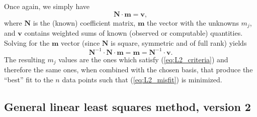 Once again, we simply have
\begin{equation}
\mathbf{N \cdot m = v},
\label{eq:Nxvsolution}
\end{equation}
where $\mathbf{N}$ is the (known) coefficient matrix, $\mathbf{m}$ the vector with the unknowns $m_j$, and $\mathbf{v}$ contains 
weighted sums of known (observed or computable) quantities. Solving for the $\mathbf{m}$ vector (since $\mathbf{N}$ is square, symmetric and 
of full rank) yields
\begin{equation}
\mathbf{N}^{-1} \cdot \mathbf{N \cdot m} = \mathbf{m} = \mathbf{N}^{-1} \cdot \mathbf{v}.
\end{equation}	 
The resulting $m_j$ values are the ones which satisfy (\ref{eq:L2_criteria}) and 
therefore the same ones, when combined with the chosen basis, that produce the ``best'' fit to the 
$n$ data points such that (\ref{eq:L2_misfit}) is minimized.

\subsection{General linear least squares method, version 2}

